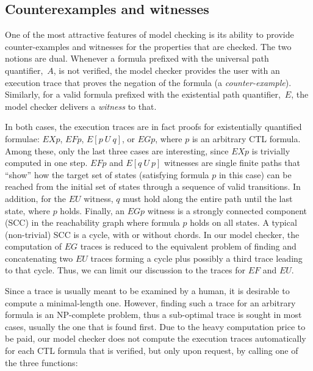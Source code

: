 \begin{developer}
\section{Counterexamples and witnesses}


One of the most attractive features of model checking is its ability to provide
counter-examples and witnesses for the properties that are checked. The
two notions are dual. Whenever a formula prefixed with the universal path
quantifier,~$A$, is not verified, the model checker provides the user with
an execution trace that proves the negation of the formula (a
\emph{counter-example}). Similarly, for a valid formula prefixed with the
existential path quantifier,~$E$, the model checker delivers a
\emph{witness} to that.

In both cases, the execution traces are in fact proofs for
existentially quantified formulae: $EX p$, $EF p$, $E[p~U~q]$, or $EG p$,
where $p$ is an arbitrary CTL formula.
Among these, only the last three cases are interesting,
since $EX p$ is trivially computed in one step.
$EF p$ and $E[q~U~p]$ witnesses are single finite paths that ``show'' how the
target set of states (satisfying formula $p$ in this case) can be reached
from the initial set of states through a sequence of valid transitions.
In addition, for the $EU$ witness, $q$ must hold along the entire path until
the last state, where $p$ holds.
Finally, an $EG p$ witness is a strongly connected component (SCC) in the
reachability graph where formula $p$ holds on all states.
A typical (non-trivial) SCC is a cycle, with or without chords.
In our model checker, the computation of $EG$ traces is reduced to the
equivalent problem of finding and concatenating two $EU$ traces
forming a cycle plus possibly a third trace leading to that cycle.
Thus, we can limit our discussion to the traces for $EF$ and $EU$.

Since a trace is usually meant to be examined by a human, it is desirable
to compute a minimal-length one.
However, finding such a trace for an
arbitrary formula is an NP-complete problem, thus a sub-optimal trace is
sought in most cases, usually the one that is found first. Due to the
heavy computation price to be paid, our model checker does not compute the
execution traces automatically for each CTL formula that is verified, but
only upon request, by calling one of the three functions:


\end{developer}
